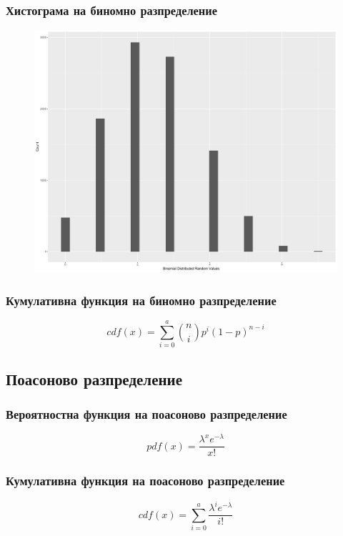 \documentclass{beamer}
\begin{document}
\begin{frame}
\frametitle{Хистограма на биномно разпределение}
\begin{figure}[]\includegraphics[width=\textwidth,height=0.75\textheight]{pic0053}\end{figure}
\end{frame}

\begin{frame}
\frametitle{Кумулативна функция на биномно разпределение}
\begin{equation}
cdf(x) = \sum_{i=0}^{a}\binom{n}{i}p^{i}(1-p)^{n-i}
\end{equation}
\end{frame}

\subsection{Поасоново разпределение}

\begin{frame}
\frametitle{Вероятностна функция на поасоново разпределение}
\begin{equation}
pdf(x) = \frac{\lambda^{x}e^{-\lambda}}{x!}
\end{equation}
\end{frame}

\begin{frame}
\frametitle{Кумулативна функция на поасоново разпределение}
\begin{equation}
cdf(x) = \sum_{i=0}^{a}\frac{\lambda^{i}e^{-\lambda}}{i!}
\end{equation}
\end{frame}
\end{document}
